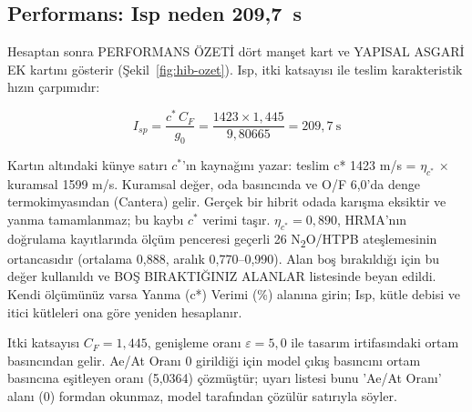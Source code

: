 \documentclass[11pt,a4paper]{article}
\newcommand{\ui}[1]{\textsf{#1}}
\begin{document}
\subsection{Performans: Isp neden 209,7~s}

Hesaptan sonra \ui{PERFORMANS ÖZETİ} dört manşet kart ve \ui{YAPISAL ASGARİ EK} kartını gösterir (Şekil~\ref{fig:hib-ozet}).
Isp, itki katsayısı ile teslim karakteristik hızın çarpımıdır:

\[
I_{sp} = \frac{c^*\,C_F}{g_0} = \frac{1423 \times 1{,}445}{9{,}80665} = 209{,}7~\text{s}
\]

Kartın altındaki künye satırı $c^*$'ın kaynağını yazar: \ui{teslim c* 1423 m/s
= $\eta_{c^*}$ × kuramsal 1599 m/s}. Kuramsal değer, oda basıncında ve O/F
6,0'da denge termokimyasından (Cantera) gelir. Gerçek bir hibrit odada karışma
eksiktir ve yanma tamamlanmaz; bu kaybı $c^*$ verimi taşır. $\eta_{c^*} =
0{,}890$, HRMA'nın doğrulama kayıtlarında ölçüm penceresi geçerli 26
N\textsubscript{2}O/HTPB ateşlemesinin ortancasıdır (ortalama 0,888, aralık
0,770--0,990). Alan boş bırakıldığı için bu
değer kullanıldı ve \ui{BOŞ BIRAKTIĞINIZ ALANLAR} listesinde beyan edildi. Kendi
ölçümünüz varsa \ui{Yanma (c*) Verimi (\%)} alanına girin; Isp, kütle debisi
ve itici kütleleri ona göre yeniden hesaplanır.

Itki katsayısı $C_F = 1{,}445$, genişleme oranı $\varepsilon = 5{,}0$ ile
tasarım irtifasındaki ortam basıncından gelir. \ui{Ae/At Oranı} 0 girildiği
için model çıkış basıncını ortam basıncına eşitleyen oranı (5,0364) çözmüştür;
uyarı listesi bunu \ui{'Ae/At Oranı' alanı (0) formdan okunmaz, model
tarafından çözülür} satırıyla söyler.
\end{document}
